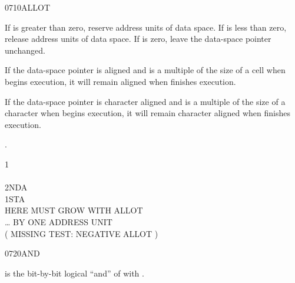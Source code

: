 \begin{worddef}{0710}{ALLOT}
\item {}

	If  is greater than zero, reserve  address units
	of data space. If  is less than zero, release 
	address units of data space. If  is zero, leave the
	data-space pointer unchanged.

	If the data-space pointer is aligned and  is a multiple
	of the size of a cell when  begins execution, it will
	remain aligned when  finishes execution.

	If the data-space pointer is character aligned and  is a
	multiple of the size of a character when  begins
	execution, it will remain character aligned when 
	finishes execution.

\see {}.

	\begin{testing} %
		\ttfamily
		 1  \\
		 \\
		 2NDA \\
		 1STA \\
		 \tab {} HERE MUST GROW WITH ALLOT \\
		 \tab {} {\ldots} BY ONE ADDRESS UNIT \\
		( MISSING TEST: NEGATIVE ALLOT )
	\end{testing}
\end{worddef}


\begin{worddef}{0720}{AND}
\item {}

	 is the bit-by-bit logical ``and'' of 
	with .

	\begin{testing} %
		 \\
		 \\
		 \\

		 \\

		 \\
		 \\
		 \\
	\end{testing}
\end{worddef}


